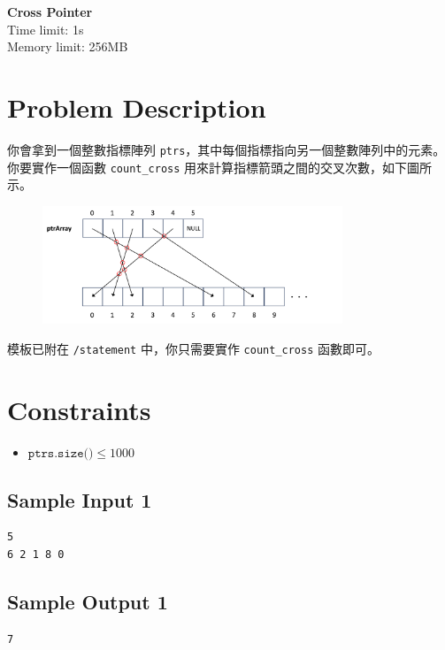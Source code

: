 \documentclass[12pt, a4paper]{article}
\begin{document}
\begin{center}
    \parbox{0.8\textwidth}{
        \centering
        \vspace{0.5em}
        \LARGE \textbf{Cross Pointer}\\[0.5em]
        \large{Time limit: 1s}\\
        \large{Memory limit: 256MB}\\[0.8em]
    }
\end{center}
\thispagestyle{fancy}

\section*{Problem Description}
你會拿到一個整數指標陣列 \texttt{ptrs}，其中每個指標指向另一個整數陣列中的元素。你要實作一個函數 \texttt{count\_cross} 用來計算指標箭頭之間的交叉次數，如下圖所示。

\begin{figure}[H]
    \centering
    \includegraphics[width=0.8\textwidth]{./pointer.png}
\end{figure}

模板已附在 \texttt{/statement} 中，你只需要實作 \texttt{count\_cross} 函數即可。

\section*{Constraints}
\begin{itemize}
    \item $\texttt{ptrs.size()} \le 1000$
\end{itemize}

\begin{paracol}{2}
    \subsection*{Sample Input 1}
    \begin{lstlisting}
5
6 2 1 8 0
    \end{lstlisting}
    \switchcolumn
    \subsection*{Sample Output 1}
    \begin{lstlisting}
7
    \end{lstlisting}
\end{paracol}
\end{document}
